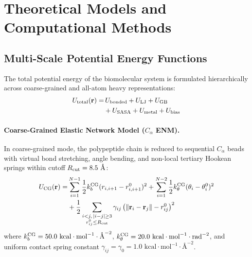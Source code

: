 \documentclass[journal=jpcbfk,manuscript=article]{achemso}
\begin{document}
\section{Theoretical Models and Computational Methods}

\subsection{Multi-Scale Potential Energy Functions}
The total potential energy of the biomolecular system is formulated hierarchically across coarse-grained and all-atom heavy representations:
\begin{align}
U_{\rm total}(\mathbf{r}) = &\, U_{\rm bonded} + U_{\rm LJ} + U_{\rm GB} \nonumber \\
&+ U_{\rm SASA} + U_{\rm metal} + U_{\rm bias}
\end{align}

\paragraph{Coarse-Grained Elastic Network Model ($C_\alpha$ ENM).}
In coarse-grained mode, the polypeptide chain is reduced to sequential $C_\alpha$ beads with virtual bond stretching, angle bending, and non-local tertiary Hookean springs within cutoff $R_{\rm cut} = 8.5\text{ \AA}$:\cite{bahar1997vibrational,atilgan2001anisotropy}
\begin{align}
U_{\rm CG}(\mathbf{r}) = &\sum_{i=1}^{N-1} \frac{1}{2} k_b^{\rm CG} (r_{i,i+1} - r_{i,i+1}^0)^2 + \sum_{i=1}^{N-2} \frac{1}{2} k_\theta^{\rm CG} (\theta_i - \theta_i^0)^2 \nonumber \\
&+ \frac{1}{2} \sum_{\substack{i < j, \, |i-j| \ge 3 \\ r_{ij}^0 \le R_{\rm cut}}} \gamma_{ij} \left( \|\mathbf{r}_i - \mathbf{r}_j\| - r_{ij}^0 \right)^2
\end{align}
where $k_b^{\rm CG} = 50.0\text{ kcal}\cdot\text{mol}^{-1}\cdot\text{\AA}^{-2}$, $k_\theta^{\rm CG} = 20.0\text{ kcal}\cdot\text{mol}^{-1}\cdot\text{rad}^{-2}$, and uniform contact spring constant $\gamma_{ij} = \gamma_0 = 1.0\text{ kcal}\cdot\text{mol}^{-1}\cdot\text{\AA}^{-2}$.
\end{document}
